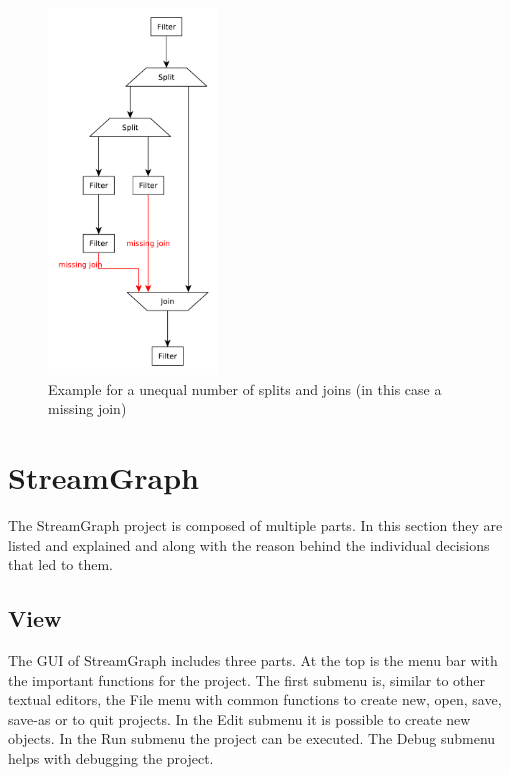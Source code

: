 \documentclass[journal]{IEEEtran}
\begin{document}
\begin{figure}[h]
	\centering
	\includegraphics[width=0.4\textwidth]{StreamItTopologyMissingJoin}
	\caption{Example for a unequal number of splits and joins (in this case a missing join)}
	\label{fig_StreamIt_topology_missing_join}
\end{figure}


\section{StreamGraph}

\noindent The StreamGraph project is composed of multiple parts. In this
section they are listed and explained and along with the reason behind the
individual decisions that led to them.

\subsection{View}
\noindent The GUI of StreamGraph includes three parts. At the top is the menu
bar with the important functions for the project. The first submenu is, similar to
other textual editors, the File menu with common functions to create new, open, save,
save-as or to quit projects. In the Edit submenu it is possible to create new objects.
In the Run submenu the project can be executed. The Debug submenu helps with debugging
the project. \\
\end{document}
